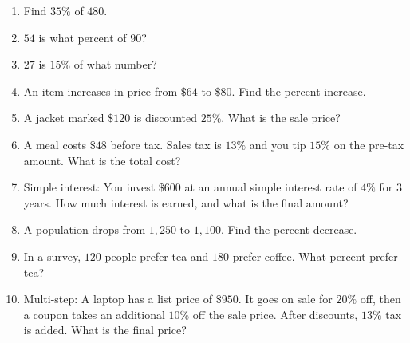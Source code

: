 \documentclass[12pt]{article}
\begin{document}
\begin{enumerate}
\item Find $35\%$ of $480$.

\item $54$ is what percent of $90$?

\item $27$ is $15\%$ of what number?

\item An item increases in price from $\$64$ to $\$80$. Find the percent increase.

\item A jacket marked $\$120$ is discounted $25\%$. What is the sale price?

\item A meal costs $\$48$ before tax. Sales tax is $13\%$ and you tip $15\%$ on the pre-tax amount. What is the total cost?

\item Simple interest: You invest $\$600$ at an annual simple interest rate of $4\%$ for $3$ years. How much interest is earned, and what is the final amount?

\item A population drops from $1{,}250$ to $1{,}100$. Find the percent decrease.

\item In a survey, $120$ people prefer tea and $180$ prefer coffee. What percent prefer tea?

\item Multi-step: A laptop has a list price of $\$950$. It goes on sale for $20\%$ off, then a coupon takes an additional $10\%$ off the sale price. After discounts, $13\%$ tax is added. What is the final price?

\end{enumerate}

\newpage
\end{document}
